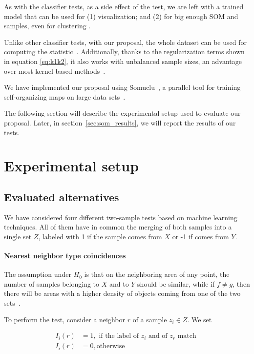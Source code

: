 As with the classifier tests, as a side effect of the test, we are left with a
trained model that can be used for (1) visualization; and (2) for big enough
\gls{SOM}  and samples, even for clustering \cite{ultsch2005esom}.

Unlike other classifier tests, with our proposal, the whole dataset can be used
for computing the statistic~\cite{kirchler2020two}. Additionally, thanks to the
regularization terms shown in equation \ref{eq:k1k2}, it also works with
unbalanced sample sizes, an advantage over most kernel-based methods~\cite{song2021fast}.

We have implemented our proposal using Somuclu~\cite{wittek2013somoclu}, a parallel
tool for training self-organizing maps on large data sets~\cite{wittek2013somoclu}.

The following section will describe the experimental setup used to evaluate our proposal.
Later, in section~\ref{sec:som_results}, we will report the results of our tests.

\section{Experimental setup}
\label{sec:som_exp_setup}

\subsection{Evaluated alternatives}

We have considered four different two-sample tests based on machine learning techniques.
All of them have in common the merging of both samples into a single set $Z$,
labeled with 1 if the sample comes from $X$ or -1 if comes from $Y$.

\paragraph{Nearest neighbor type coincidences}

The assumption under $H_0$ is that on the neighboring area of any point, the number of samples
belonging to $X$ and to $Y$ should be similar, while if $f \neq g$, then there will be areas with
a higher density of objects coming from one of the two sets~\cite{Henze1988,Schilling1986b}.

To perform the test, consider a neighbor $r$ of a sample $z_i \in Z$. We set

\begin{equation}
\begin{split}
    I_i(r) &= 1, \textrm{ if the label of } z_i \textrm{ and of } z_r \textrm{ match }\\
    I_i(r) &= 0, \textrm{otherwise}
\end{split}
\end{equation}

